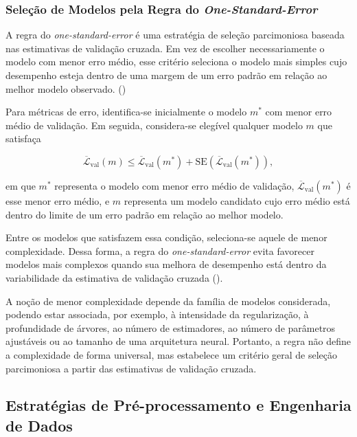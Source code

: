 \subsubsection*{Seleção de Modelos pela Regra do \textit{One-Standard-Error}}

A regra do \textit{one-standard-error} é uma estratégia de seleção parcimoniosa baseada nas estimativas de validação cruzada. Em vez de escolher necessariamente o modelo com menor erro médio, esse critério seleciona o modelo mais simples cujo desempenho esteja dentro de uma margem de um erro padrão em relação ao melhor modelo observado. (\cite{Yates2022})

Para métricas de erro, identifica-se inicialmente o modelo \(m^\ast\) com menor erro médio de validação. Em seguida, considera-se elegível qualquer modelo \(m\) que satisfaça

\begin{equation}
\overline{\mathcal{L}}_{\mathrm{val}}(m)
\leq
\overline{\mathcal{L}}_{\mathrm{val}}(m^\ast)
+
\mathrm{SE}\left(\overline{\mathcal{L}}_{\mathrm{val}}(m^\ast)\right),
\label{eq:one_standard_error}
\end{equation}

\noindent em que \(m^\ast\) representa o modelo com menor erro médio de validação, \(\overline{\mathcal{L}}_{\mathrm{val}}(m^\ast)\) é esse menor erro médio, e \(m\) representa um modelo candidato cujo erro médio está dentro do limite de um erro padrão em relação ao melhor modelo.

Entre os modelos que satisfazem essa condição, seleciona-se aquele de menor complexidade. Dessa forma, a regra do \textit{one-standard-error} evita favorecer modelos mais complexos quando sua melhora de desempenho está dentro da variabilidade da estimativa de validação cruzada (\cite{Hastie2009ESL}).

A noção de menor complexidade depende da família de modelos considerada, podendo estar associada, por exemplo, à intensidade da regularização, à profundidade de árvores, ao número de estimadores, ao número de parâmetros ajustáveis ou ao tamanho de uma arquitetura neural. Portanto, a regra não define a complexidade de forma universal, mas estabelece um critério geral de seleção parcimoniosa a partir das estimativas de validação cruzada.
\subsection{Estratégias de Pré-processamento e Engenharia de Dados}

